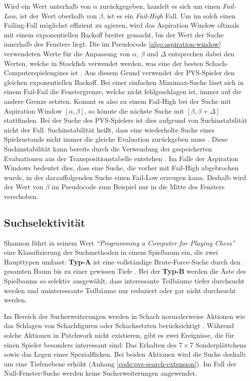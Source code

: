 Wird ein Wert unterhalb von $\alpha$ zurückgegeben, handelt es sich um einen \emph{Fail-Low}, ist der Wert oberhalb von $\beta$, ist es ein \emph{Fail-High} Fall. Um im solch einen Failing-Fall möglichst effizient zu agieren, wird das Aspiration Window oftmals mit einem exponentiellen Backoff breiter gemacht, bis der Wert der Suche innerhalb des Fensters liegt. Die im Pseudocode \ref{algo:aspiration-window} verwendeten Werte für die Anpassung von $\alpha$, $\beta$ und $\Delta$ entsprechen dabei den Werten, welche in Stockfish verwendet werden, was eine der besten Schach-Computerspielengines ist \cite{2024.StockfishBackoff} \cite{2024.Stockfish}. Aus diesem Grund verwendet der \ac{PVS}-Spieler den gleichen exponentiellen Backoff. Bei einer einfachen Mimimax-Suche lässt sich in einem Fail-Fail die Fenstergrenze, welche nicht fehlgeschlagen ist, immer auf die andere Grenze setzten. Kommt es also zu einem Fail-High bei der Suche mit Aspiration Window $\left[\alpha, \beta\right]$, so könnte die nächste Suche mit $\left[\beta, \beta + \Delta\right]$ stattfinden. Bei der Suche des \ac{PVS}-Spielers ist dies aufgrund von Suchinstabilität nicht der Fall. Suchinstabilität heißt, dass eine wiederholte Suche eines Spielzustands nicht immer die gleiche Evaluation zurückgeben muss \cite{2003.SearchInstability}. Diese Suchinstabilität kann bereits durch die Verwendung der gespeicherten Evaluationen aus der Transpositionstabelle entstehen \cite{2003.SearchInstability}. Im Falle der Aspiration Windows bedeutet dies, dass eine Suche, die vorher mit Fail-High abgebrochen wurde, in der darauffolgenden Suche einen Fail-Low erzeugen kann. Deshalb wird der Wert von $\beta$ im Pseudocode zum Beispiel nur in die Mitte des Fensters verschoben.

\subsection{Suchselektivität}

Shannon führt in seinem Wert \emph{\enquote{Programming a Computer for Playing Chess}} eine Klassifizierung der Suchmethoden in einem Spielbaum ein, die zwei Haupttypen umfasst: \textbf{Typ-A} ist eine vollständige Brute-Force-Suche durch den gesamten Baum bis zu einer gewissen Tiefe \cite[S. 8]{1950.ChessShannon}. Bei der \textbf{Typ-B} werden die Äste des Spielbaums so selektiv ausgewählt, dass interessante Teilbäume tiefer durchsucht werden und uninteressante Teilbäume nur reduziert oder gar nicht durchsucht werden.

Im Bereich der Sucherweiterungen werden in Schach normalerweise Aktionen wie das Schlagen von Schachfiguren oder Schachsetzten berücksichtigt \cite[S. 14]{1950.ChessShannon}\cite{2023.StockfishTerminology}\cite{2002.SearchExtensions}. Während solche Aktionen in Patchwork nicht existieren, gibt es zwei Ereignisse, die für einen Spieler besonders interessant sind: Das Erhalten des $7\times 7$ Sonderplättchens sowie das Legen eines Spezialflicken. Bei beiden Aktionen wird die Suche deshalb um eine Tiefenebene erhöht (Anhang \ref{code:pvs-search-extension}). Im Fall der Null-Fenster-Suche werden keine Sucherweiterungen angewendet.

